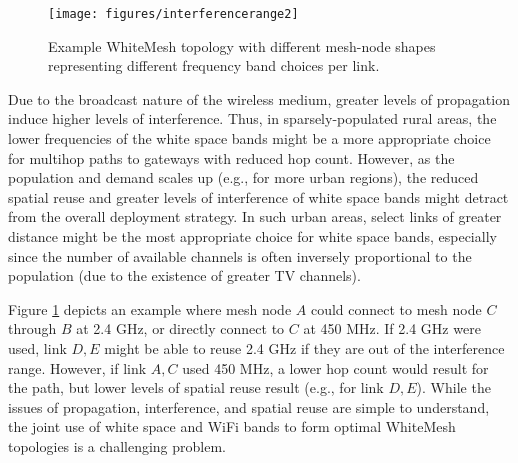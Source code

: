 \begin{figure}
\vspace{-0.0in}
\centering
\texttt{[image: figures/interferencerange2]}
\vspace{-0.1in}
\caption{Example WhiteMesh topology with different mesh-node shapes 
representing different frequency band choices per link.}
\label{fig:interferencerange}
\vspace{-0.2in}
\end{figure}

Due to the broadcast nature of the wireless medium, greater levels of
propagation induce higher levels of interference.  Thus, in sparsely-populated
rural areas, the lower frequencies of the white space bands might be a
more appropriate choice for multihop paths to gateways with reduced hop
count. However, as the population and demand scales up (e.g., for more 
urban regions), the reduced spatial reuse and greater levels of interference 
of white space bands might detract from the overall deployment strategy. In 
such urban areas, select links of greater distance might be the most 
appropriate choice for white space bands, especially since the number of 
available channels is often inversely proportional to the population (due 
to the existence of greater TV channels).

Figure \ref{fig:interferencerange} depicts an example where mesh node $A$ 
could connect to mesh node $C$ through $B$ at 2.4 GHz, or directly connect 
to $C$ at 450 MHz. If 2.4 GHz were used, link $D,E$ might be able to reuse
2.4 GHz if they are out of the interference range. However, if link $A,C$
used 450 MHz, a lower hop count would result for the path, but lower levels
of spatial reuse result (e.g., for link $D,E$). While the issues of 
propagation, interference, and spatial reuse are simple to understand,
the joint use of white space and WiFi bands to form optimal WhiteMesh 
topologies is a challenging problem.

